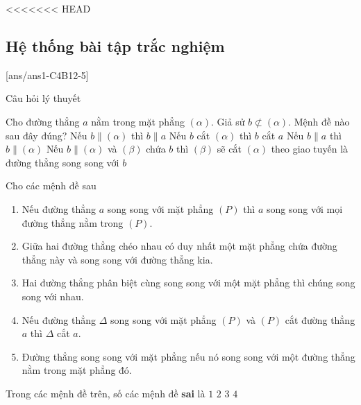 <<<<<<< HEAD
\subsection{Hệ thống bài tập trắc nghiệm}
[ans/ans1-C4B12-5]
\begin{dang}{Câu hỏi lý thuyết}
\end{dang}
	\begin{ex}%
		Cho đường thẳng $a$ nằm trong mặt phẳng $(\alpha)$. Giả sử $b \not\subset (\alpha)$. Mệnh đề nào sau đây đúng?
		\choice
		{Nếu $b \parallel (\alpha)$ thì $b \parallel a$}
		{Nếu $b$ cắt $(\alpha)$ thì $b$ cắt $a$}
		{\True Nếu $b \parallel a$ thì $b \parallel (\alpha)$}
		{Nếu $b \parallel (\alpha)$ và $(\beta)$ chứa $b$ thì $(\beta)$ sẽ cắt $(\alpha)$ theo giao tuyến là đường thẳng song song với $b$}
	\end{ex}
	\begin{ex}%
		Cho các mệnh đề sau
		\begin{enumerate}[1.]
			\item Nếu đường thẳng $a$ song song với mặt phẳng $(P)$ thì $a$ song song với mọi đường thẳng nằm trong $(P)$.
			\item Giữa hai đường thẳng chéo nhau có duy nhất một mặt phẳng chứa đường thẳng này và song song với đường thẳng kia.
			\item Hai đường thẳng phân biệt cùng song song với một mặt phẳng thì chúng song song với nhau.
			\item Nếu đường thẳng $\Delta$ song song với mặt phẳng $(P)$ và $(P)$ cắt đường thẳng $a$ thì $\Delta$ cắt $a$.
			\item Đường thẳng song song với mặt phẳng nếu nó song song với một đường thẳng nằm trong mặt phẳng đó.
		\end{enumerate}
		Trong các mệnh đề trên, số các mệnh đề \textbf{sai} là
		\choice
		{$1$}
		{$2$}
		{$3$}
		{\True $4$}
	\end{ex}

